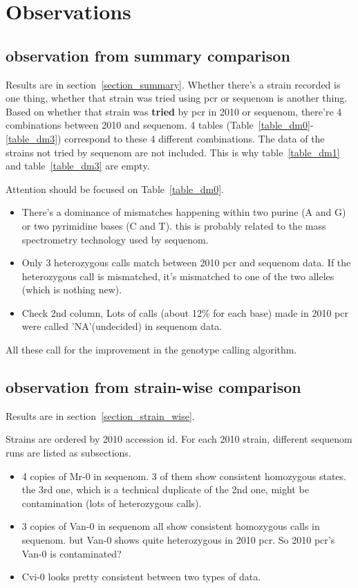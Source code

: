 \documentclass[a3paper,10pt]{article}
\begin{document}
\section{Observations}
\subsection{observation from summary comparison}
Results are in section~\ref{section_summary}. Whether there's a strain recorded is one thing, whether that strain was tried using pcr or sequenom is another thing. Based on whether that strain was \textbf{tried} by pcr in 2010 or sequenom, there're 4 combinations between 2010 and sequenom. 4 tables (Table~\ref{table_dm0}-\ref{table_dm3}) correspond to these 4 different combinations. The data of the strains not tried by sequenom are not included. This is why table~\ref{table_dm1} and table~\ref{table_dm3} are empty.

Attention should be focused on Table~\ref{table_dm0}.
\begin{itemize}
 \item There's a dominance of mismatches happening within two purine (A and G) or two pyrimidine bases (C and T). this is probably related to the mass spectrometry technology used by sequenom.
\item Only 3 heterozygous calls match between 2010 pcr and sequenom data. If the heterozygous call is mismatched, it's mismatched to one of the two alleles (which is nothing new).
\item Check 2nd column, Lots of calls (about 12\% for each base) made in 2010 pcr were called 'NA'(undecided) in sequenom data.
\end{itemize}

All these call for the improvement in the genotype calling algorithm.

\subsection{observation from strain-wise comparison}
Results are in section~\ref{section_strain_wise}.

Strains are ordered by 2010 accession id. For each 2010 strain, different sequenom runs are listed as subsections.

\begin{itemize}
 \item 4 copies of Mr-0 in sequenom. 3 of them show consistent homozygous states. the 3rd one, which is a technical duplicate of the 2nd one, might be contamination (lots of heterozygous calls).
\item 3 copies of Van-0 in sequenom all show consistent homozygous calls in sequenom. but Van-0 shows quite heterozygous in 2010 pcr. So 2010 pcr's Van-0 is contaminated?
\item Cvi-0 looks pretty consistent between two types of data.
\end{itemize}
\end{document}
